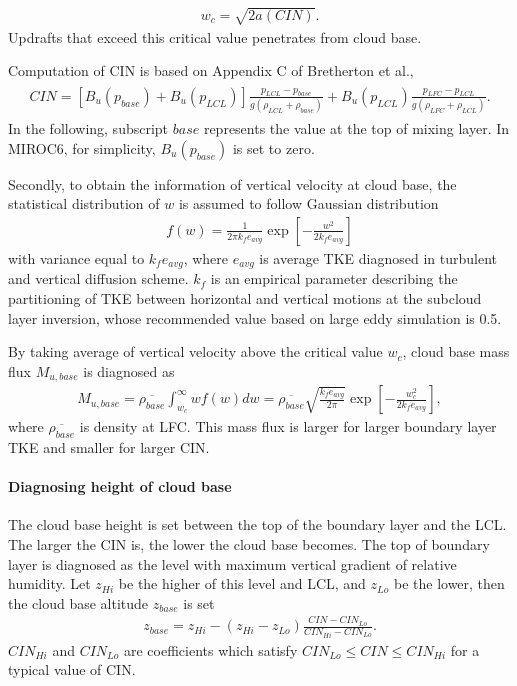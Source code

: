 \begin{eqnarray}\label{wc}
    w_c = \sqrt{2a(CIN)}.\end{eqnarray} Updrafts that exceed this critical value penetrates from cloud base.

Computation of CIN is based on Appendix C of Bretherton et al., \begin{eqnarray}\begin{aligned}
\label{def_CIN}
    CIN = [B_u(p_{base}) + B_u(p_{LCL})]\frac{p_{LCL}-p_{base}}{g(\rho_{LCL}+\rho_{base})} + B_u(p_{LCL})\frac{p_{LFC}-p_{LCL}}{g(\rho_{LFC}+\rho_{LCL})}.\end{aligned}\end{eqnarray} In the following, subscript
\(\mathit{base}\) represents the value at the top of mixing layer. In MIROC6, for simplicity, \(B_u(p_{base})\) is set to zero.

Secondly, to obtain the information of vertical velocity at cloud base, the statistical distribution of \(w\) is assumed to follow Gaussian distribution \begin{eqnarray}\label{distr_w}
    f(w) = \frac{1}{2\pi k_f e_{avg}}\exp\left[ -\frac{w^2}{2k_fe_{avg}}\right]\end{eqnarray} with variance equal to \(k_f e_{avg}\), where \(e_{avg}\) is average TKE diagnosed in turbulent and vertical diffusion
scheme. \(k_f\) is an empirical parameter describing the partitioning of TKE between horizontal and vertical motions at the subcloud layer inversion, whose recommended value based on large eddy
simulation is 0.5.

By taking average of vertical velocity above the critical value \(w_c\), cloud base mass flux \(M_{u,base}\) is diagnosed as \begin{eqnarray}\label{Mubase}
    M_{u,base}=\overline{\rho_{base}}\int_{w_c}^{\infty}wf(w)dw =\overline{\rho_{base}}\sqrt{\frac{k_f e_{avg}}{2\pi}}\exp\left[-\frac{w_c^2}{2k_fe_{avg}}\right],\end{eqnarray} where \(\overline{\rho_{base}}\) is
density at LFC. This mass flux is larger for larger boundary layer TKE and smaller for larger CIN.

\hypertarget{diagno-height-of-cloud-base}{%
\paragraph{Diagnosing height of cloud base}\label{diagno-height-of-cloud-base}}

The cloud base height is set between the top of the boundary layer and the LCL. The larger the CIN is, the lower the cloud base becomes. The top of boundary layer is diagnosed as the level with
maximum vertical gradient of relative humidity. Let \(z_{Hi}\) be the higher of this level and LCL, and \(z_{Lo}\) be the lower, then the cloud base altitude \(z_{base}\) is set \begin{eqnarray}\label{zbase}
    z_{base} = z_{Hi} - (z_{Hi}-z_{Lo})\frac{CIN-CIN_{Lo}}{CIN_{Hi} - CIN_{Lo}}.\end{eqnarray} \(CIN_{Hi}\) and \(CIN_{Lo}\) are coefficients which satisfy \(CIN_{Lo}\le CIN \le CIN_{Hi}\) for a typical value of
CIN.


